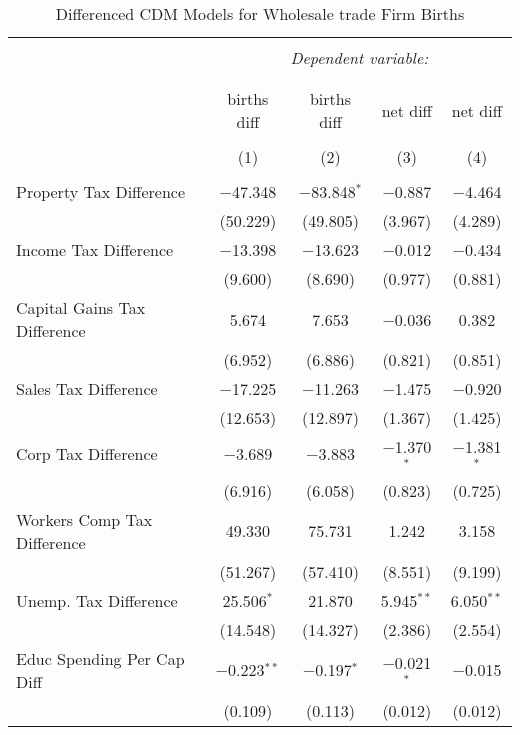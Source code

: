 
\begin{table}[!htbp] \centering 
  \caption{Differenced CDM Models for  Wholesale trade Firm Births} 
  \label{} 
\begin{tabular}{@{\extracolsep{5pt}}lcccc} 
\\[-1.8ex]\hline 
\hline \\[-1.8ex] 
 & \multicolumn{4}{c}{\textit{Dependent variable:}} \\ 
\cline{2-5} 
\\[-1.8ex] & \multicolumn{4}{c}{ } \\ 
 & births diff & births diff & net diff & net diff \\ 
\\[-1.8ex] & (1) & (2) & (3) & (4)\\ 
\hline \\[-1.8ex] 
 Property Tax Difference & $-$47.348 & $-$83.848$^{*}$ & $-$0.887 & $-$4.464 \\ 
  & (50.229) & (49.805) & (3.967) & (4.289) \\ 
  Income Tax Difference & $-$13.398 & $-$13.623 & $-$0.012 & $-$0.434 \\ 
  & (9.600) & (8.690) & (0.977) & (0.881) \\ 
  Capital Gains Tax Difference & 5.674 & 7.653 & $-$0.036 & 0.382 \\ 
  & (6.952) & (6.886) & (0.821) & (0.851) \\ 
  Sales Tax Difference & $-$17.225 & $-$11.263 & $-$1.475 & $-$0.920 \\ 
  & (12.653) & (12.897) & (1.367) & (1.425) \\ 
  Corp Tax Difference & $-$3.689 & $-$3.883 & $-$1.370$^{*}$ & $-$1.381$^{*}$ \\ 
  & (6.916) & (6.058) & (0.823) & (0.725) \\ 
  Workers Comp Tax Difference & 49.330 & 75.731 & 1.242 & 3.158 \\ 
  & (51.267) & (57.410) & (8.551) & (9.199) \\ 
  Unemp. Tax Difference & 25.506$^{*}$ & 21.870 & 5.945$^{**}$ & 6.050$^{**}$ \\ 
  & (14.548) & (14.327) & (2.386) & (2.554) \\ 
  Educ Spending Per Cap Diff & $-$0.223$^{**}$ & $-$0.197$^{*}$ & $-$0.021$^{*}$ & $-$0.015 \\ 
  & (0.109) & (0.113) & (0.012) & (0.012) \\ 

\end{tabular}
\end{table}
